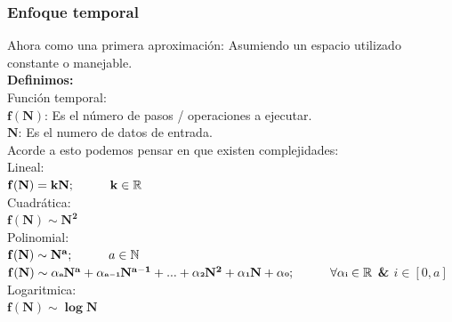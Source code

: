 \documentclass[10pt,executivepaper]{article}
\newcommand\tab[1][1cm]{\hspace*{#1}}
\begin{document}
\subsubsection{Enfoque temporal}
Ahora como una primera aproximación: Asumiendo un espacio utilizado constante o manejable.\\
\textbf{Definimos:}\\
Función temporal: \\
\tab $\mathbf{f(N)}$: Es el número de pasos / operaciones a ejecutar.\\
\tab $\mathbf{N}$: Es el numero de datos de entrada.\\
Acorde a esto podemos pensar en que existen complejidades:\\
\tab Lineal: \\\tab\tab$\mathbf{f(N) = kN; \tab k \in \mathbb{R}}$\\
\tab Cuadrática: \\\tab\tab$\mathbf{f(N)  \sim {N^2}}$\\
\tab Polinomial: \\\tab\tab$\mathbf{f(N) \sim {N^a}}; \tab a \in \mathbb{N}$\\
\tab\tab\textbf{$\mathbf{f(N) \sim \alpha{\scriptscriptstyle a}N^a + \alpha{\scriptscriptstyle a-1}N^{a-1} + ... + \alpha{\scriptscriptstyle 2}N^2 + \alpha{\scriptscriptstyle 1}N + \alpha{\scriptscriptstyle 0};\tab \forall\alpha{\scriptscriptstyle i} \in \mathbb{R}}$  \&  $ i \in [0 , a]$}\\
\tab Logaritmica: \\\tab\tab $\mathbf{f(N) \sim \log{N}}$\\
\end{document}
